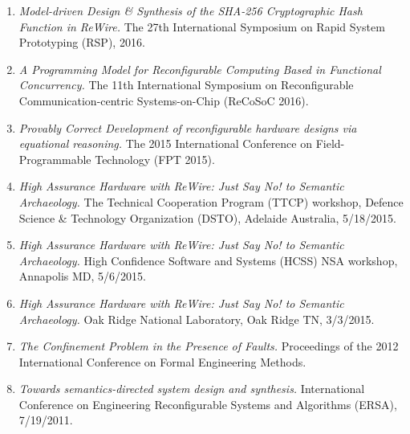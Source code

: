 \documentclass[12pt]{article} %
\begin{document}
\begin{enumerate}[leftmargin=0mm]
\item{\it Model-driven Design \& Synthesis of the SHA-256 Cryptographic Hash Function in ReWire.} The 27th International Symposium on Rapid System Prototyping (RSP), 2016.

\item{\it A Programming Model for Reconfigurable Computing Based in Functional Concurrency.} The 11th International Symposium on Reconfigurable Communication-centric Systems-on-Chip (ReCoSoC 2016).

\item{\it Provably Correct Development of reconfigurable hardware designs via equational reasoning.} The 2015 International Conference on Field-Programmable Technology (FPT 2015).

\item{\it High Assurance Hardware with ReWire: Just Say No! to Semantic Archaeology.}
The Technical Cooperation Program (TTCP) workshop, Defence Science \& Technology Organization (DSTO), Adelaide Australia, 5/18/2015.






\item{\it High Assurance Hardware with ReWire: Just Say No! to Semantic Archaeology.}
High Confidence Software and Systems (HCSS) NSA workshop, Annapolis MD, 5/6/2015.

\item{\it High Assurance Hardware with ReWire: Just Say No! to Semantic Archaeology.}
Oak Ridge National Laboratory, Oak Ridge TN, 3/3/2015.

\item{\it The Confinement Problem in the Presence of Faults.} Proceedings of the 2012 International Conference on Formal Engineering Methods.

\item{\it Towards semantics-directed system design and synthesis.}
International Conference on
  Engineering Reconfigurable Systems and Algorithms (ERSA), 7/19/2011.
  

\end{enumerate}
\end{document}
